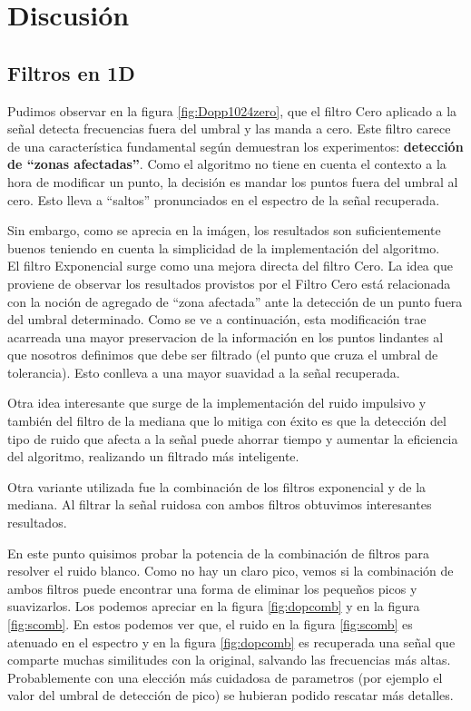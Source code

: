 \section{Discusi\'on}

\subsection{Filtros en 1D}

Pudimos observar en la figura \ref{fig:Dopp1024zero}, que el filtro Cero
aplicado a la se\~nal detecta frecuencias fuera del umbral y
las manda a cero. Este filtro carece de una caracter\'istica fundamental
seg\'un demuestran los experimentos:
{\bf detecci\'on de ``zonas afectadas''}. Como el algoritmo no tiene en
cuenta el contexto a la hora de modificar un punto, la decisi\'on es mandar los
puntos fuera del umbral al cero. Esto lleva a ``saltos'' pronunciados en
el espectro de la se\~nal recuperada.

Sin embargo, como se aprecia en la im\'agen, los resultados son suficientemente
buenos teniendo en cuenta la simplicidad de la implementaci\'on del algoritmo.\\

El filtro Exponencial surge como una mejora directa del filtro Cero.
La idea que proviene de observar los resultados provistos por el Filtro Cero est\'a relacionada con la
noci\'on de agregado de ``zona afectada'' ante la detecci\'on de un punto fuera
del umbral determinado. Como se ve a continuaci\'on, esta modificaci\'on trae
acarreada una mayor preservacion de la informaci\'on en los puntos lindantes al que nosotros
definimos que debe ser filtrado (el punto que cruza el umbral de tolerancia). Esto conlleva 
a una mayor suavidad a la se\~nal recuperada.

Otra idea interesante que surge de la implementaci\'on del ruido impulsivo y tambi\'en del
filtro de la mediana que lo mitiga con \'exito es que la detecci\'on del tipo de ruido que afecta
a la se\~nal puede ahorrar tiempo y aumentar la eficiencia del algoritmo, realizando un filtrado m\'as
inteligente.


Otra variante utilizada fue la combinaci\'on de los filtros exponencial y
de la mediana. Al filtrar la se\~nal ruidosa con ambos filtros obtuvimos interesantes
resultados.

En este punto quisimos probar la potencia de la combinaci\'on de filtros para resolver
el ruido blanco. Como no hay un claro pico, vemos si la combinaci\'on de ambos
filtros puede encontrar una forma de eliminar los peque\~nos picos y suavizarlos.
Los podemos apreciar en la figura \ref{fig:dopcomb} y en la figura \ref{fig:scomb}.
En estos podemos ver que, el ruido en la figura \ref{fig:scomb} es atenuado
en el espectro y en la figura \ref{fig:dopcomb} es recuperada una se\~nal que
comparte muchas similitudes con la original, salvando las frecuencias
m\'as altas. Probablemente con una elecci\'on m\'as cuidadosa de parametros (por ejemplo
el valor del umbral de detecci\'on de pico) se hubieran podido rescatar m\'as detalles.


